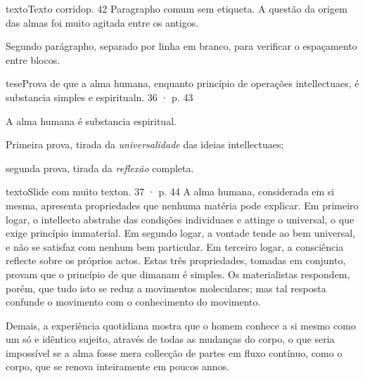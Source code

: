 \documentclass[aspectratio=169,11pt]{beamer}
\begin{document}
\begin{slide}{texto}{Texto corrido}{p. 42}
Paragrapho comum sem etiqueta. A questão da origem das almas foi muito agitada entre os antigos.

Segundo parágrapho, separado por linha em branco, para verificar o espaçamento entre blocos.
\end{slide}

\begin{slide}{tese}{Prova de que a alma humana, enquanto princípio de operações intellectuaes, é substancia simples e espiritual}{n. 36 · p. 43}
\begin{enunciado}
A alma humana é substancia espiritual.
\end{enunciado}
\begin{topicos}
\item Primeira prova, tirada da \textit{universalidade} das ideias intellectuaes;
\item segunda prova, tirada da \textit{reflexão} completa.
\end{topicos}
\end{slide}

\begin{slide}{texto}{Slide com muito texto}{n. 37 · p. 44}
A alma humana, considerada em si mesma, apresenta propriedades que nenhuma matéria pode explicar. Em primeiro logar, o intellecto abstrahe das condições individuaes e attinge o universal, o que exige princípio immaterial. Em segundo logar, a vontade tende ao bem universal, e não se satisfaz com nenhum bem particular. Em terceiro logar, a consciência reflecte sobre os próprios actos. Estas três propriedades, tomadas em conjunto, provam que o princípio de que dimanam é simples. Os materialistas respondem, porém, que tudo isto se reduz a movimentos moleculares; mas tal resposta confunde o movimento com o conhecimento do movimento.

Demais, a experiência quotidiana mostra que o homem conhece a si mesmo como um só e idêntico sujeito, através de todas as mudanças do corpo, o que seria impossível se a alma fosse mera collecção de partes em fluxo contínuo, como o corpo, que se renova inteiramente em poucos annos.
\continua
\end{slide}
\end{document}
